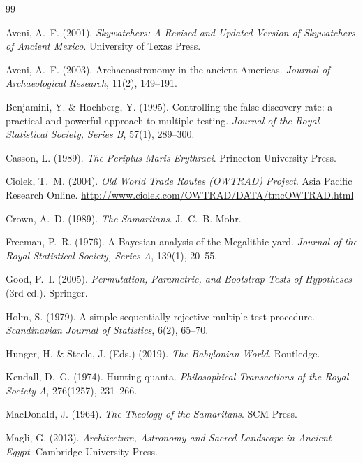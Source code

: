\documentclass[12pt,a4paper]{article}
\begin{document}
\begin{thebibliography}{99}

Aveni, A.~F. (2001).
\textit{Skywatchers: A Revised and Updated Version of Skywatchers of Ancient Mexico}.
University of Texas Press.

Aveni, A.~F. (2003).
Archaeoastronomy in the ancient Americas.
\textit{Journal of Archaeological Research}, 11(2), 149--191.

Benjamini, Y. \& Hochberg, Y. (1995).
Controlling the false discovery rate: a practical and powerful approach
to multiple testing.
\textit{Journal of the Royal Statistical Society, Series B}, 57(1), 289--300.

Casson, L. (1989).
\textit{The Periplus Maris Erythraei}.
Princeton University Press.

Ciolek, T.~M. (2004).
\textit{Old World Trade Routes (OWTRAD) Project}.
Asia Pacific Research Online.
\url{http://www.ciolek.com/OWTRAD/DATA/tmcOWTRAD.html}

Crown, A.~D. (1989).
\textit{The Samaritans}.
J.~C.~B. Mohr.

Freeman, P.~R. (1976).
A Bayesian analysis of the Megalithic yard.
\textit{Journal of the Royal Statistical Society, Series A}, 139(1), 20--55.

Good, P.~I. (2005).
\textit{Permutation, Parametric, and Bootstrap Tests of Hypotheses} (3rd ed.).
Springer.

Holm, S. (1979).
A simple sequentially rejective multiple test procedure.
\textit{Scandinavian Journal of Statistics}, 6(2), 65--70.

Hunger, H. \& Steele, J. (Eds.) (2019).
\textit{The Babylonian World}.
Routledge.

Kendall, D.~G. (1974).
Hunting quanta.
\textit{Philosophical Transactions of the Royal Society A},
276(1257), 231--266.

MacDonald, J. (1964).
\textit{The Theology of the Samaritans}.
SCM Press.

Magli, G. (2013).
\textit{Architecture, Astronomy and Sacred Landscape in Ancient Egypt}.
Cambridge University Press.


\end{thebibliography}
\end{document}
